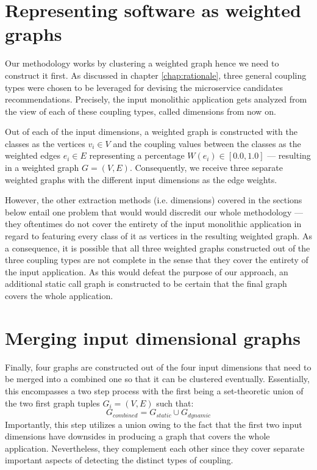 \documentclass[12pt,a4paper]{report}
\begin{document}
\section{Representing software as weighted graphs} \label{sect:software-as-weighted-graph}

Our methodology works by clustering a weighted graph hence we need to construct
it first. As discussed in chapter \ref{chap:rationale}, three general
coupling types were chosen to be leveraged for devising the microservice
candidates recommendations.
Precisely, the input monolithic application gets analyzed from the view of
each of these coupling types, called dimensions from now on.

Out of each of the input dimensions, a weighted graph is constructed with the classes
as the vertices \(v_i \in V\) and the coupling values between the classes
as the weighted edges \(e_i \in E\) representing a percentage
\(W(e_i) \in [0.0, 1.0]\) --- resulting in a weighted graph \(G = (V, E)\).
Consequently, we receive three separate weighted graphs with the different
input dimensions as the edge weights.

However, the other extraction methods (i.e. dimensions) covered in the
sections below entail one problem that would would discredit
our whole methodology --- they oftentimes do not cover the entirety of the
input monolithic application in regard to featuring every class of it
as vertices in the resulting weighted graph.
As a consequence, it is possible that all three weighted graphs constructed
out of the three coupling types are not complete in the sense that they cover
the entirety of the input application. As this would defeat the purpose of
our approach, an additional static call graph is constructed to be certain
that the final graph covers the whole application.



\section{Merging input dimensional graphs} \label{sect:merging-graphs}

Finally, four graphs are constructed out of the four input dimensions
that need to be merged into a combined one so that it can be clustered eventually.
Essentially, this encompasses a two step process with the first being
a set-theoretic union of the two first graph tuples \(G_i = (V, E)\) such that:
\[
  G_{combined} = G_{static} \cup G_{dynamic}
\]
Importantly, this step utilizes a union owing to the fact
that the first two input dimensions have downsides in producing a graph
that covers the whole application.
Nevertheless, they complement each other since they cover separate important
aspects of detecting the distinct types of coupling.
\end{document}
